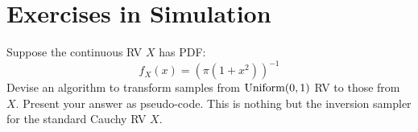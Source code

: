 \section{Exercises in Simulation}\label{S:xsSimulation}
\begin{ExerciseList}
\Exercise Suppose the continuous RV $X$ has PDF:
\[
f_X(x) = \left(\pi(1+x^2) \right)^{-1}
\]
Devise an algorithm to transform samples from $\mbox{{\rm Uniform}}(0,1)$ RV to those from $X$. Present your answer as pseudo-code.
\Answer
This is nothing but the inversion sampler for the standard Cauchy RV $X$.
\end{ExerciseList}

